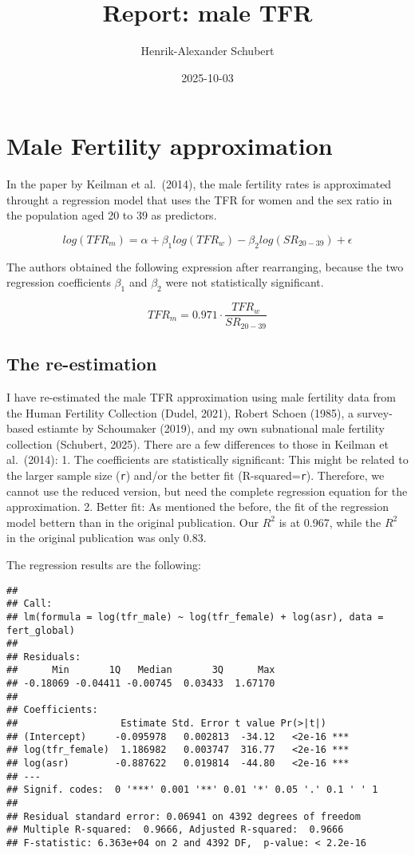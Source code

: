 \documentclass[
]{article}
\title{Report: male TFR}
\author{Henrik-Alexander Schubert}
\date{2025-10-03}
\begin{document}
\maketitle

\section{Male Fertility
approximation}\label{male-fertility-approximation}

In the paper by Keilman et al.~(2014), the male fertility rates is
approximated throught a regression model that uses the TFR for women and
the sex ratio in the population aged 20 to 39 as predictors.

\[
log(TFR_m)=\alpha + \beta_1 log(TFR_w) - \beta_2 log(SR_{20-39}) + \epsilon
\]

The authors obtained the following expression after rearranging, because
the two regression coefficients \(\beta_1\) and \(\beta_2\) were not
statistically significant.

\[
TFR_m=0.971 \cdot \frac{TFR_w}{SR_{20-39}}
\]

\subsection{The re-estimation}\label{the-re-estimation}

I have re-estimated the male TFR approximation using male fertility data
from the Human Fertility Collection (Dudel, 2021), Robert Schoen (1985),
a survey-based estiamte by Schoumaker (2019), and my own subnational
male fertility collection (Schubert, 2025). There are a few differences
to those in Keilman et al.~(2014): 1. The coefficients are statistically
significant: This might be related to the larger sample size
(\texttt{r}) and/or the better fit (R-squared=\texttt{r}). Therefore, we
cannot use the reduced version, but need the complete regression
equation for the approximation. 2. Better fit: As mentioned the before,
the fit of the regression model bettern than in the original
publication. Our \(R^2\) is at 0.967, while the \(R^2\) in the original
publication was only 0.83.

The regression results are the following:

\begin{verbatim}
## 
## Call:
## lm(formula = log(tfr_male) ~ log(tfr_female) + log(asr), data = fert_global)
## 
## Residuals:
##      Min       1Q   Median       3Q      Max 
## -0.18069 -0.04411 -0.00745  0.03433  1.67170 
## 
## Coefficients:
##                  Estimate Std. Error t value Pr(>|t|)    
## (Intercept)     -0.095978   0.002813  -34.12   <2e-16 ***
## log(tfr_female)  1.186982   0.003747  316.77   <2e-16 ***
## log(asr)        -0.887622   0.019814  -44.80   <2e-16 ***
## ---
## Signif. codes:  0 '***' 0.001 '**' 0.01 '*' 0.05 '.' 0.1 ' ' 1
## 
## Residual standard error: 0.06941 on 4392 degrees of freedom
## Multiple R-squared:  0.9666, Adjusted R-squared:  0.9666 
## F-statistic: 6.363e+04 on 2 and 4392 DF,  p-value: < 2.2e-16
\end{verbatim}
\end{document}
